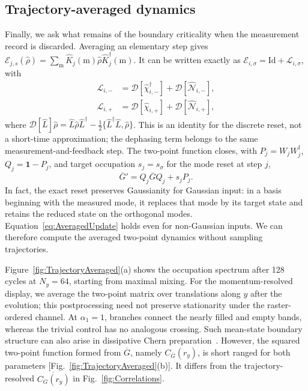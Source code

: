 \documentclass[aps,prb,10pt,twocolumn,superscriptaddress,longbibliography,floatfix]{revtex4-2}
\newcommand{\mc}[1]{\mathcal{#1}}
\newcommand{\Id}{\mathbf{1}}
\newcommand{\claudeadd}[1]{{\color{orange}#1}}
\begin{document}
{\color{blue}
\subsection{Trajectory-averaged dynamics}
\label{sec:TrajectoryAveraged}

Finally, we ask what remains of the boundary criticality when the measurement record is discarded. Averaging an elementary step gives $\mc E_{j,s}(\hat\rho)=\sum_{\mathrm m}\hat K_j(\mathrm m)\hat\rho\hat K_j^\dagger(\mathrm m)$. It can be written exactly as $\mc E_{i,\sigma}=\mathrm{Id}+\mc L_{i,\sigma}$, with
\begin{align}
 \mc L_{i,-}&=\mc D[\hat\chi_{i,-}^\dagger]+\mc D[\hat{\mc N}_{i,-}],\nonumber\\
 \mc L_{i,+}&=\mc D[\hat\chi_{i,+}]+\mc D[\hat{\mc N}_{i,+}],
 \label{eq:AveragedChannel}
\end{align}
where $\mc D[\hat L]\hat\rho=\hat L\hat\rho\hat L^\dagger-\tfrac12\{\hat L^\dagger\hat L,\hat\rho\}$. This is an identity for the discrete reset, not a short-time approximation; the dephasing term belongs to the same measurement-and-feedback step. The two-point function closes, with \claudeadd{$P_j=W_jW_j^\dagger$}, $Q_j=\Id-P_j$, and target occupation $s_j=s_\sigma$ for the mode reset at step $j$,
\begin{equation}
 \overline G'=Q_j\overline GQ_j+s_jP_j.
 \label{eq:AveragedUpdate}
\end{equation}
In fact, the exact reset preserves Gaussianity for Gaussian input: in a basis beginning with the measured mode, it replaces that mode by its target state and retains the reduced state on the orthogonal modes. Equation~\eqref{eq:AveragedUpdate} holds even for non-Gaussian inputs. We can therefore compute the averaged two-point dynamics without sampling trajectories.

Figure~\ref{fig:TrajectoryAveraged}(a) shows the occupation spectrum after 128 cycles at $N_y=64$, starting from maximal mixing. For the momentum-resolved display, we average the two-point matrix over translations along $y$ after the evolution; this postprocessing need not preserve stationarity under the raster-ordered channel. At $\alpha_1=1$, branches connect the nearly filled and empty bands, whereas the trivial control has no analogous crossing. Such mean-state boundary structure can also arise in dissipative Chern preparation~\cite{Goldstein2019}. However, the squared two-point function formed from $\overline G$, namely $C_{\overline G}(r_y)$, is short ranged for both parameters [Fig.~\ref{fig:TrajectoryAveraged}(b)]. It differs from the trajectory-resolved $\overline{C_G(r_y)}$ in Fig.~\ref{fig:Correlations}.

}
\end{document}
